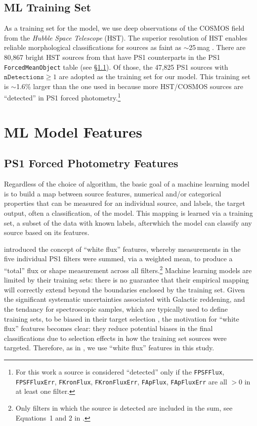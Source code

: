 \documentclass[twocolumn]{aastex63}
\begin{document}
\subsection{ML Training Set}\label{sec:training_set}

As a training set for the model, we use deep observations of the COSMOS field
from the \textit{Hubble Space Telescope} (HST). The superior
resolution of HST enables reliable morphological classifications for
sources as faint as $\sim$25\,mag \citep{Leauthaud07}. There are 80,867 bright
HST sources from \citet{Leauthaud07} that have PS1 counterparts
\citep[within a 1\arcsec match radius; see][]{Tachibana18} in the PS1
\texttt{ForcedMeanObject} table (see \S\ref{sec:features}). Of those, the
47,825 PS1 sources with $\mathtt{nDetections} \ge 1$ are adopted as the
training set for our model. This training set is $\sim$1.6\%
larger than the one used in \citet{Tachibana18} because more HST/COSMOS sources
are ``detected'' in PS1 forced photometry.\footnote{For this work a source is considered ``detected'' only if the \texttt{FPSFFlux}, \texttt{FPSFFluxErr}, \texttt{FKronFlux}, \texttt{FKronFluxErr}, \texttt{FApFlux}, \texttt{FApFluxErr} are all $> 0$ in at least one filter.}

\section{ML Model Features}\label{sec:ML_features}

\subsection{PS1 Forced Photometry Features}\label{sec:features}

Regardless of the choice of algorithm, the basic goal of a machine learning
model is to build a map between source features, numerical and/or categorical
properties that can be measured for an individual source, and labels, the
target output, often a classification, of the model. This mapping is learned
via a training set, a subset of the data with known labels, afterwhich the
model can classify any source based on its features.

\citet{Tachibana18} introduced the concept of ``white flux'' features, whereby
measurements in the five individual PS1 filters were summed, via a weighted
mean, to produce a ``total'' flux or shape measurement across all
filters.\footnote{Only filters in which the source is detected are included in
the sum, see Equations~1 and 2 in \citet{Tachibana18}.} Machine learning
models are limited by their training sets: there is no guarantee that their
empirical mapping will correctly extend beyond the boundaries enclosed by the
training set. Given the significant systematic uncertainties associated with
Galactic reddening, and the tendancy for spectroscopic samples, which are
typically used to define training sets, to be biased in their target selection
\citep[see e.g.,][]{Miller17}, the motivation for ``white flux'' features
becomes clear: they reduce potential biases in the final classifications due
to selection effects in how the training set sources were targeted. Therefore,
as in \citet{Tachibana18}, we use ``white flux'' features in this study.
\end{document}
